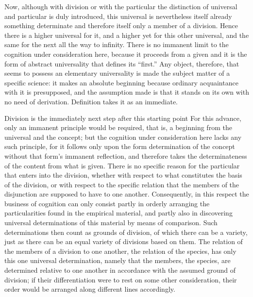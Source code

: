 Now, although with division or with the particular
the distinction of universal and particular is duly introduced,
this universal is nevertheless itself already something determinate
and therefore itself only a member of a division.
Hence there is a higher universal for it,
and a higher yet for this other universal,
and the same for the next all the way to infinity.
There is no immanent limit to
the cognition under consideration here,
because it proceeds from a given
and it is the form of abstract universality
that defines its “first.”
Any object, therefore, that seems to possess
an elementary universality is
made the subject matter of a specific science:
it makes an absolute beginning
because ordinary acquaintance with it is presupposed,
and the assumption made is
that it stands on its own with no need of derivation.
Definition takes it as an immediate.

Division is the immediately next step after this starting point
For this advance, only an immanent principle would be required,
that is, a beginning from the universal and the concept;
but the cognition under consideration
here lacks any such principle,
for it follows only upon
the form determination of the concept
without that form's immanent reflection,
and therefore takes the determinateness of
the content from what is given.
There is no specific reason for
the particular that enters into the division,
whether with respect to what constitutes
the basis of the division,
or with respect to the specific relation
that the members of the disjunction
are supposed to have to one another.
Consequently, in this respect the business of cognition
can only consist partly in orderly arranging
the particularities found in the empirical material,
and partly also in discovering universal determinations of
this material by means of comparison.
Such determinations then count as grounds of division,
of which there can be a variety,
just as there can be an equal variety of divisions based on them.
The relation of the members of a division to one another,
the relation of the species,
has only this one universal determination,
namely that the members, the species,
are determined relative to one another in accordance
with the assumed ground of division;
if their differentiation were
to rest on some other consideration,
their order would be arranged
along different lines accordingly.

